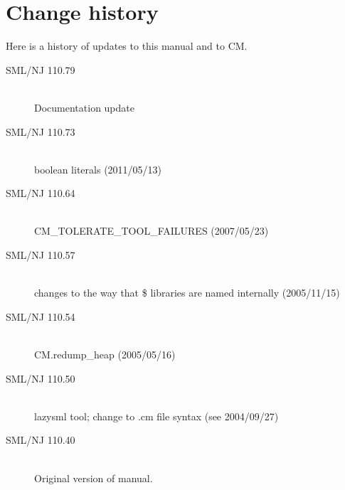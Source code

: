 %
\section{Change history}
\label{sec:changes}

Here is a history of updates to this manual and to CM.
\begin{description}
  \item[SML/NJ 110.79]
    \mbox{}\\[0.5em]
    Documentation update

  \item[SML/NJ 110.73]
    \mbox{}\\[0.5em]
    boolean literals (2011/05/13)

  \item[SML/NJ 110.64]
    \mbox{}\\[0.5em]
     CM\_TOLERATE\_TOOL\_FAILURES (2007/05/23)
     
  \item[SML/NJ 110.57]
    \mbox{}\\[0.5em]
    changes to the way that \$ libraries are named internally (2005/11/15)

  \item[SML/NJ 110.54]
    \mbox{}\\[0.5em]
    CM.redump\_heap (2005/05/16)

  \item[SML/NJ 110.50]
    \mbox{}\\[0.5em]
    lazysml tool; change to .cm file syntax (see 2004/09/27)
    
  \item[SML/NJ 110.40]
    \mbox{}\\[0.5em]
    Original version of manual.
\end{description}%
